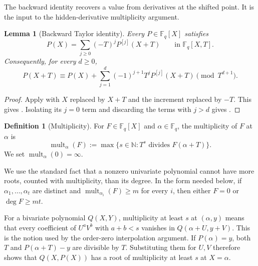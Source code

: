\documentclass[11pt,letterpaper]{article}
\newtheorem{lemma}[lemma]{Lemma}
\theoremstyle{definition}
\newtheorem{definition}[definition]{Definition}
\newcommand{\F}{\mathbb{F}}
\newcommand{\N}{\mathbb{N}}
\begin{document}
The backward identity recovers a value from derivatives at the shifted
point. It is the input to the hidden-derivative multiplicity argument.

\begin{lemma}[Backward Taylor identity]
\label{lem:backward-taylor}
Every \(P\in\F_q[X]\) satisfies
\begin{equation}
  P(X)=\sum_{j\geq 0}(-T)^jP^{[j]}(X+T)
  \qquad\text{in }\F_q[X,T].
  \label{eq:backward-taylor}
\end{equation}
Consequently, for every \(d\geq 0\),
\begin{equation}
  P(X+T)
  \equiv
  P(X)+\sum_{j=1}^{d}(-1)^{j+1}T^jP^{[j]}(X+T)
  \pmod{T^{d+1}}.
  \label{eq:backward-taylor-truncated}
\end{equation}
\end{lemma}

\begin{proof}
Apply  with \(X\) replaced by \(X+T\) and the increment
replaced by \(-T\).  This gives .  Isolating its
\(j=0\) term and discarding the terms with \(j>d\) gives
.
\end{proof}

\begin{definition}[Multiplicity]
\label{def:root-multiplicity}
For \(F\in\F_q[X]\) and \(\alpha\in\F_q\), the multiplicity of \(F\) at
\(\alpha\) is
\begin{equation}
  \operatorname{mult}_{\alpha}(F)
  :=\max\{s\in\N:T^s\text{ divides }F(\alpha+T)\}.
  \label{eq:root-multiplicity}
\end{equation}
We set \(\operatorname{mult}_{\alpha}(0)=\infty\).
\end{definition}

We use the standard fact that a nonzero univariate polynomial cannot have more
roots, counted with multiplicity, than its degree.  In the form needed below,
if \(\alpha_1,\ldots,\alpha_t\) are distinct and
\(\operatorname{mult}_{\alpha_i}(F)\geq m\) for every \(i\), then either
\(F=0\) or \(\deg F\geq mt\).

For a bivariate polynomial $Q(X,Y)$, multiplicity at least $s$ at
$(\alpha,y)$ means that every coefficient of $U^aV^b$ with $a+b<s$
vanishes in $Q(\alpha+U,y+V)$. This is the notion used by the
order-zero interpolation argument. If $P(\alpha)=y$, both $T$ and
$P(\alpha+T)-y$ are divisible by $T$. Substituting them for $U,V$
therefore shows that $Q(X,P(X))$ has a root of multiplicity at least
$s$ at $X=\alpha$.
\end{document}
